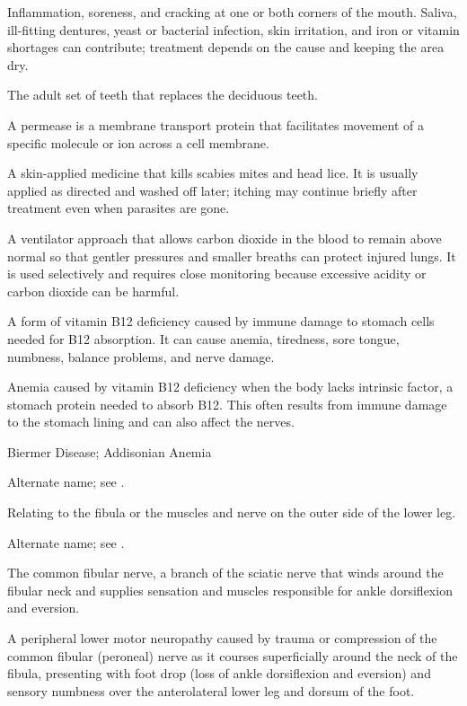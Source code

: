  Inflammation, soreness, and cracking at one or both corners of the mouth. Saliva, ill-fitting dentures, yeast or bacterial infection, skin irritation, and iron or vitamin shortages can contribute; treatment depends on the cause and keeping the area dry.

 The adult set of teeth that replaces the deciduous teeth.

 A permease is a membrane transport protein that facilitates movement of a specific molecule or ion across a cell membrane.

 A skin-applied medicine that kills scabies mites and head lice. It is usually applied as directed and washed off later; itching may continue briefly after treatment even when parasites are gone.

 A ventilator approach that allows carbon dioxide in the blood to remain above normal so that gentler pressures and smaller breaths can protect injured lungs. It is used selectively and requires close monitoring because excessive acidity or carbon dioxide can be harmful.

 A form of vitamin B12 deficiency caused by immune damage to stomach cells needed for B12 absorption. It can cause anemia, tiredness, sore tongue, numbness, balance problems, and nerve damage.

 Anemia caused by vitamin B12 deficiency when the body lacks intrinsic factor, a stomach protein needed to absorb B12. This often results from immune damage to the stomach lining and can also affect the nerves.

\synonyms
Biermer Disease; Addisonian Anemia

 Alternate name; see .

 Relating to the fibula or the muscles and nerve on the outer side of the lower leg.

 Alternate name; see .

 The common fibular nerve, a branch of the sciatic nerve that winds around the fibular neck and supplies sensation and muscles responsible for ankle dorsiflexion and eversion.

 A peripheral lower motor neuropathy caused by trauma or compression of the common fibular (peroneal) nerve as it courses superficially around the neck of the fibula, presenting with foot drop (loss of ankle dorsiflexion and eversion) and sensory numbness over the anterolateral lower leg and dorsum of the foot.


